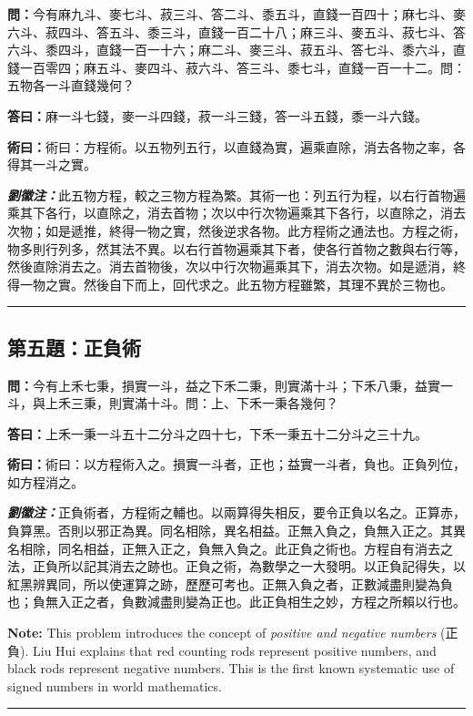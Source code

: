 \documentclass[11pt,a4paper]{article}
\newcommand{\wen}[1]{\textbf{\color{problemcolor}問：}#1\par}
\newcommand{\da}[1]{\textbf{答曰：}#1\par}
\newcommand{\shu}[1]{\textbf{術曰：}#1\par}
\newcommand{\liuhui}[1]{{\color{commentarycolor}\textit{\textbf{劉徽注：}}#1\par}}
\begin{document}
\wen{今有麻九斗、麥七斗、菽三斗、答二斗、黍五斗，直錢一百四十；麻七斗、麥六斗、菽四斗、答五斗、黍三斗，直錢一百二十八；麻三斗、麥五斗、菽七斗、答六斗、黍四斗，直錢一百一十六；麻二斗、麥三斗、菽五斗、答七斗、黍六斗，直錢一百零四；麻五斗、麥四斗、菽六斗、答三斗、黍七斗，直錢一百一十二。問：五物各一斗直錢幾何？}

\da{麻一斗七錢，麥一斗四錢，菽一斗三錢，答一斗五錢，黍一斗六錢。}

\shu{術曰：方程術。以五物列五行，以直錢為實，遍乘直除，消去各物之率，各得其一斗之實。}

\liuhui{此五物方程，較之三物方程為繁。其術一也：列五行为程，以右行首物遍乘其下各行，以直除之，消去首物；次以中行次物遍乘其下各行，以直除之，消去次物；如是遞推，終得一物之實，然後逆求各物。此方程術之通法也。方程之術，物多則行列多，然其法不異。以右行首物遍乘其下者，使各行首物之數與右行等，然後直除消去之。消去首物後，次以中行次物遍乘其下，消去次物。如是遞消，終得一物之實。然後自下而上，回代求之。此五物方程雖繁，其理不異於三物也。}

\bigskip
\hrule
\bigskip

\subsection{第五題：正負術}

\wen{今有上禾七秉，損實一斗，益之下禾二秉，則實滿十斗；下禾八秉，益實一斗，與上禾三秉，則實滿十斗。問：上、下禾一秉各幾何？}

\da{上禾一秉一斗五十二分斗之四十七，下禾一秉五十二分斗之三十九。}

\shu{術曰：以方程術入之。損實一斗者，正也；益實一斗者，負也。正負列位，如方程消之。}

\liuhui{正負術者，方程術之輔也。以兩算得失相反，要令正負以名之。正算赤，負算黑。否則以邪正為異。同名相除，異名相益。正無入負之，負無入正之。其異名相除，同名相益，正無入正之，負無入負之。此正負之術也。方程自有消去之法，正負所以記其消去之跡也。正負之術，為數學之一大發明。以正負記得失，以紅黑辨異同，所以使運算之跡，歷歷可考也。正無入負之者，正數減盡則變為負也；負無入正之者，負數減盡則變為正也。此正負相生之妙，方程之所賴以行也。}

\textbf{Note:} This problem introduces the concept of \textit{positive and negative numbers} (正負). Liu Hui explains that red counting rods represent positive numbers, and black rods represent negative numbers. This is the first known systematic use of signed numbers in world mathematics.

\bigskip
\hrule
\bigskip
\end{document}

